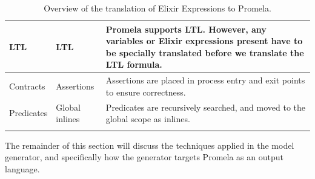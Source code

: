 \begin{longtable}{|>{\raggedright\arraybackslash}p{4cm}|>{\raggedright\arraybackslash}p{4cm}|>{\raggedright\arraybackslash}p{6cm}|}
        \hline
        LTL & LTL & Promela supports LTL. However, any variables or Elixir expressions present have to be specially translated before we translate the LTL formula. \\
        \hline
        Contracts & Assertions & Assertions are placed in process entry and exit points to ensure correctness. \\
        \hline
        Predicates & Global inlines & Predicates are recursively searched, and moved to the global scope as inlines. \\
        \hline
    \caption{Overview of the translation of Elixir Expressions to Promela.}
    \label{table:translation}
\end{longtable}
The remainder of this section will discuss the techniques applied in the model generator, and specifically how the generator targets Promela as an output language.
